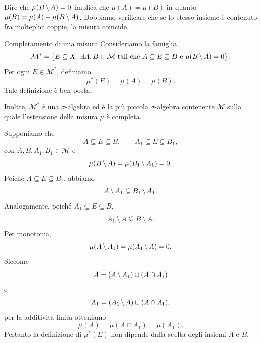 \documentclass[a4paper]{article}
\begin{document}
\begin{radioactive}
Dire che \(\mu(B\,\backslash\, A)=0\) implica che \(\mu(A) = \mu(B)\)
in quanto \(\mu(B) = \mu(A) + \mu(B \,\backslash\, A)\).
Dobbiamo verificare che se lo stesso insieme è
contenuto fra molteplici coppie, la misura coincide.
\end{radioactive}

\begin{radioactive}
\begin{snippetproposition}{Completamento di una misura}
    Consideriamo la famiglia
    \[
        \mathcal M^*
        =
        \left\{
            E \subseteq X
            \,\middle|\,
            \exists A,B \in \mathcal M
            \text{ tali che }
            A \subseteq E \subseteq B
            \text{ e }
            \mu(B \,\backslash\, A)=0
        \right\}.
    \]
    Per ogni \(E \in \mathcal M^*\), definiamo
    \[
        \mu^*(E)=\mu(A)=\mu(B).
    \]
    Tale definizione è ben posta.

    Inoltre, \(\mathcal M^*\) è una \(\sigma\)-algebra ed è la più piccola
    \(\sigma\)-algebra contenente \(\mathcal M\) sulla quale l'estensione
    della misura \(\mu\) è completa.
\end{snippetproposition}
\end{radioactive}

\begin{radioactive}
\begin{snippetproof}{}
    Supponiamo che
    \[
        A \subseteq E \subseteq B,
        \qquad
        A_1 \subseteq E \subseteq B_1,
    \]
    con \(A,B,A_1,B_1 \in \mathcal M\) e
    \[
        \mu(B \,\backslash\, A)
        =
        \mu(B_1 \,\backslash\, A_1)
        =
        0.
    \]
    Poiché \(A \subseteq E \subseteq B_1\), abbiamo
    \[
        A \,\backslash\, A_1
        \subseteq
        B_1 \,\backslash\, A_1.
    \]
    Analogamente, poiché \(A_1 \subseteq E \subseteq B\),
    \[
        A_1 \,\backslash\, A
        \subseteq
        B \,\backslash\, A.
    \]
    Per monotonia,
    \[
        \mu(A \,\backslash\, A_1)
        =
        \mu(A_1 \,\backslash\, A)
        =
        0.
    \]
    Siccome
    \[
        A
        =
        (A \,\backslash\, A_1)
        \sqcup
        (A \cap A_1)
    \]
    e
    \[
        A_1
        =
        (A_1 \,\backslash\, A)
        \sqcup
        (A \cap A_1),
    \]
    per la additività finita otteniamo
    \[
        \mu(A)
        =
        \mu(A \cap A_1)
        =
        \mu(A_1).
    \]
    Pertanto la definizione di \(\mu^*(E)\) non dipende dalla scelta
    degli insiemi \(A\) e \(B\).
\end{snippetproof}
\end{radioactive}
\end{document}
